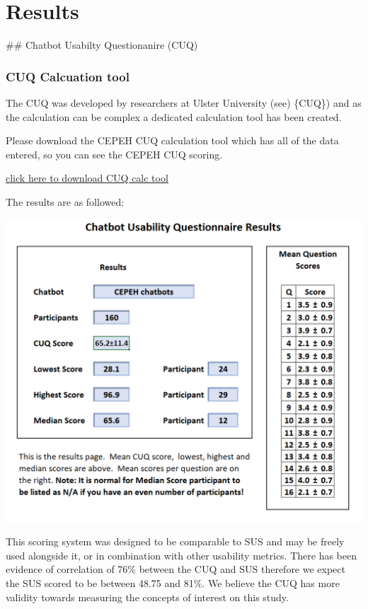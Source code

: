 \documentclass[a4paper, nobind]{templates/ociamthesis}
\begin{document}
\hypertarget{rmd-basics}{%
\chapter{Results}\label{rmd-basics}}

\minitoc 

\noindent 
\#\# Chatbot Usabilty Questionanire (CUQ)

\hypertarget{cuq-calcuation-tool}{%
\subsection{CUQ Calcuation tool}\label{cuq-calcuation-tool}}

The CUQ was developed by researchers at Ulster University (see)
\href{}{}\{CUQ\}) and as the calculation can be complex a dedicated calculation tool has been created.

Please download the CEPEH CUQ calculation tool which has all of the data entered, so you can see the CEPEH CUQ scoring.

\href{CUQ-Calculation-Tool.xlsx}{click here to download CUQ calc tool}

The results are as followed:

\includegraphics[width=14.24in]{cuq}

This scoring system was designed to be comparable to SUS and may be freely used alongside it, or in combination with other usability metrics. There has been evidence of correlation of 76\% between the CUQ and SUS therefore we expect the SUS scored to be between 48.75 and 81\%. We believe the CUQ has more validity towards measuring the concepts of interest on this study.
\end{document}
